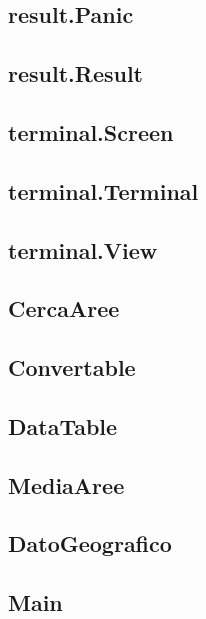 \documentclass[a4paper, 12pt,twoside]{article}
\begin{document}
			\subsection{result.Panic}
			\subsection{result.Result}
			
			\subsection{terminal.Screen}
			\subsection{terminal.Terminal}
			\subsection{terminal.View}
			
			\subsection{CercaAree}
			\subsection{Convertable}
			\subsection{DataTable}
			\subsection{MediaAree}
			\subsection{DatoGeografico}
		
		
		\subsection{Main}
		\newpage

	
	

		
	
	

	

	

	
	
	
	
	
\end{document}
